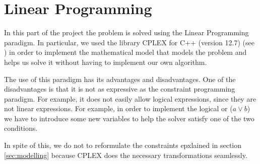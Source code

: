 \section{Linear Programming}
\label{sec:linear-programming}

In this part of the project the problem is solved using the Linear Programming
paradigm. In particular, we used the library CPLEX for C++ (version 12.7)
(see \cite{CplexWEB}) in order to implement the mathematical model that models
the problem and helps us solve it without having to implement our own algorithm.

\hfill

The use of this paradigm has its advantages and disadvantages.
One of the disadvantages is that it is not as expressive as the constraint
programming paradigm. For example, it does not easily allow logical expressions,
since they are not linear expressions. For example, in order to implement the
logical or ($a \vee b$) we have to introduce some new variables to help the
solver satisfy one of the two conditions.



\hfill

In spite of this, we do not to reformulate the constraints epxlained in
section \ref{sec:modelling} because CPLEX does the necessary transformations
seamlessly.


